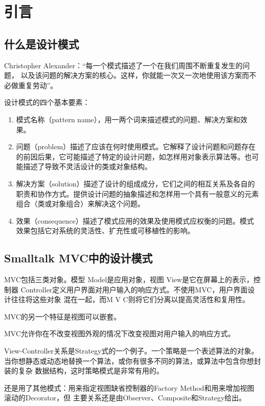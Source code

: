 \chapter{引言}
\section{什么是设计模式}
Christopher Alexander：“每一个模式描述了一个在我们周围不断重复发生的问题，
以及该问题的解决方案的核心。这样，你就能一次又一次地使用该方案而不必做重复劳动”。
\par 设计模式的四个基本要素：
\begin{enumerate}
	\item 模式名称（pattern name），用一两个词来描述模式的问题、解决方案和效果。
	\item 问题（problem）描述了应该在何时使用模式。它解释了设计问题和问题存在的前因后果，它可能描述了特定的设计问题，如怎样用对象表示算法等。也可能描述了导致不灵活设计的类或对象结构。
	\item 解决方案（solution）描述了设计的组成成分，它们之间的相互关系及各自的职责和协作方式。提供设计问题的抽象描述和怎样用一个具有一般意义的元素组合（类或对象组合）来解决这个问题。
	\item 效果（consequence）描述了模式应用的效果及使用模式应权衡的问题。模式效果包括它对系统的灵活性、扩充性或可移植性的影响。
\end{enumerate}
\section{Smalltalk MVC中的设计模式}
MVC包括三类对象。模型 Model是应用对象，视图 View是它在屏幕上的表示，控制器
Controller定义用户界面对用户输入的响应方式。不使用MVC，用户界面设计往往将这些对象
混在一起，而M V C则将它们分离以提高灵活性和复用性。
\par MVC的另一个特征是视图可以嵌套。
\par MVC允许你在不改变视图外观的情况下改变视图对用户输入的响应方式。
\par View-Controller关系是Strategy式的一个例子。一个策略是一个表述算法的对象。
当你想静态或动态地替换一个算法，或你有很多不同的算法，或算法中包含你想封装的复杂
数据结构，这时策略模式是非常有用的。
\par 还是用了其他模式：用来指定视图缺省控制器的Factory Method和用来增加视图滚动的Decorator，但
主要关系还是由Observer、Composite和Strategy给出。

